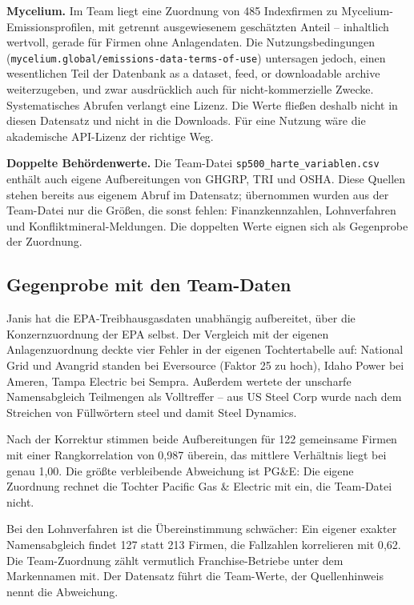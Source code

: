 \documentclass[11pt,a4paper]{article}
\begin{document}
\textbf{Mycelium.} Im Team liegt eine Zuordnung von 485 Indexfirmen zu Mycelium-Emissionsprofilen, mit getrennt ausgewiesenem geschätzten Anteil -- inhaltlich wertvoll, gerade für Firmen ohne Anlagendaten. Die Nutzungsbedingungen (\texttt{mycelium.global/emissions-data-terms-of-use}) untersagen jedoch, einen wesentlichen Teil der Datenbank \glqq as a dataset, feed, or downloadable archive\grqq{} weiterzugeben, und zwar ausdrücklich auch für nicht-kommerzielle Zwecke. Systematisches Abrufen verlangt eine Lizenz. Die Werte fließen deshalb nicht in diesen Datensatz und nicht in die Downloads. Für eine Nutzung wäre die akademische API-Lizenz der richtige Weg.

\textbf{Doppelte Behördenwerte.} Die Team-Datei \texttt{sp500\_harte\_variablen.csv} enthält auch eigene Aufbereitungen von GHGRP, TRI und OSHA. Diese Quellen stehen bereits aus eigenem Abruf im Datensatz; übernommen wurden aus der Team-Datei nur die Größen, die sonst fehlen: Finanzkennzahlen, Lohnverfahren und Konfliktmineral-Meldungen. Die doppelten Werte eignen sich als Gegenprobe der Zuordnung.

\subsection{Gegenprobe mit den Team-Daten}

Janis hat die EPA-Treibhausgasdaten unabhängig aufbereitet, über die Konzernzuordnung der EPA selbst. Der Vergleich mit der eigenen Anlagenzuordnung deckte vier Fehler in der eigenen Tochtertabelle auf: National Grid und Avangrid standen bei Eversource (Faktor 25 zu hoch), Idaho Power bei Ameren, Tampa Electric bei Sempra. Außerdem wertete der unscharfe Namensabgleich Teilmengen als Volltreffer -- aus \glqq US Steel Corp\grqq{} wurde nach dem Streichen von Füllwörtern \glqq steel\grqq{} und damit Steel Dynamics.

Nach der Korrektur stimmen beide Aufbereitungen für 122 gemeinsame Firmen mit einer Rangkorrelation von 0{,}987 überein, das mittlere Verhältnis liegt bei genau 1{,}00. Die größte verbleibende Abweichung ist PG\&E: Die eigene Zuordnung rechnet die Tochter Pacific Gas \& Electric mit ein, die Team-Datei nicht.

Bei den Lohnverfahren ist die Übereinstimmung schwächer: Ein eigener exakter Namensabgleich findet 127 statt 213 Firmen, die Fallzahlen korrelieren mit 0{,}62. Die Team-Zuordnung zählt vermutlich Franchise-Betriebe unter dem Markennamen mit. Der Datensatz führt die Team-Werte, der Quellenhinweis nennt die Abweichung.
\end{document}
